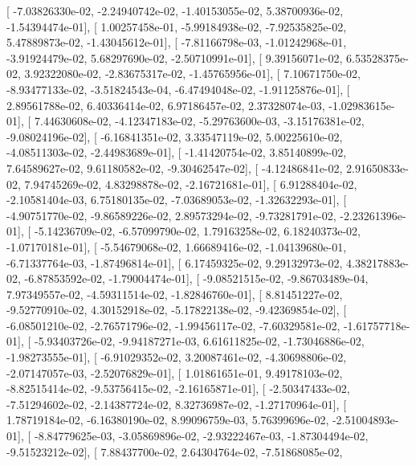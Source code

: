 \documentclass{article}
\begin{document}
       [ -7.03826330e-02,  -2.24940742e-02,  -1.40153055e-02,
          5.38700936e-02,  -1.54394474e-01],
       [  1.00257458e-01,  -5.99184938e-02,  -7.92535825e-02,
          5.47889873e-02,  -1.43045612e-01],
       [ -7.81166798e-03,  -1.01242968e-01,  -3.91924479e-02,
          5.68297690e-02,  -2.50710991e-01],
       [  9.39156071e-02,   6.53528375e-02,   3.92322080e-02,
         -2.83675317e-02,  -1.45765956e-01],
       [  7.10671750e-02,  -8.93477133e-02,  -3.51824543e-04,
         -6.47494048e-02,  -1.91125876e-01],
       [  2.89561788e-02,   6.40336414e-02,   6.97186457e-02,
          2.37328074e-03,  -1.02983615e-01],
       [  7.44630608e-02,  -4.12347183e-02,  -5.29763600e-03,
         -3.15176381e-02,  -9.08024196e-02],
       [ -6.16841351e-02,   3.33547119e-02,   5.00225610e-02,
         -4.08511303e-02,  -2.44983689e-01],
       [ -1.41420754e-02,   3.85140899e-02,   7.64589627e-02,
          9.61180582e-02,  -9.30462547e-02],
       [ -4.12486841e-02,   2.91650833e-02,   7.94745269e-02,
          4.83298878e-02,  -2.16721681e-01],
       [  6.91288404e-02,  -2.10581404e-03,   6.75180135e-02,
         -7.03689053e-02,  -1.32632293e-01],
       [ -4.90751770e-02,  -9.86589226e-02,   2.89573294e-02,
         -9.73281791e-02,  -2.23261396e-01],
       [ -5.14236709e-02,  -6.57099790e-02,   1.79163258e-02,
          6.18240373e-02,  -1.07170181e-01],
       [ -5.54679068e-02,   1.66689416e-02,  -1.04139680e-01,
         -6.71337764e-03,  -1.87496814e-01],
       [  6.17459325e-02,   9.29132973e-02,   4.38217883e-02,
         -6.87853592e-02,  -1.79004474e-01],
       [ -9.08521515e-02,  -9.86703489e-04,   7.97349557e-02,
         -4.59311514e-02,  -1.82846760e-01],
       [  8.81451227e-02,  -9.52770910e-02,   4.30152918e-02,
         -5.17822138e-02,  -9.42369854e-02],
       [ -6.08501210e-02,  -2.76571796e-02,  -1.99456117e-02,
         -7.60329581e-02,  -1.61757718e-01],
       [ -5.93403726e-02,  -9.94187271e-03,   6.61611825e-02,
         -1.73046886e-02,  -1.98273555e-01],
       [ -6.91029352e-02,   3.20087461e-02,  -4.30698806e-02,
         -2.07147057e-03,  -2.52076829e-01],
       [  1.01861651e-01,   9.49178103e-02,  -8.82515414e-02,
         -9.53756415e-02,  -2.16165871e-01],
       [ -2.50347433e-02,  -7.51294602e-02,  -2.14387724e-02,
          8.32736987e-02,  -1.27170964e-01],
       [  1.78719184e-02,  -6.16380190e-02,   8.99096759e-03,
          5.76399696e-02,  -2.51004893e-01],
       [ -8.84779625e-03,  -3.05869896e-02,  -2.93222467e-03,
         -1.87304494e-02,  -9.51523212e-02],
       [  7.88437700e-02,   2.64304764e-02,  -7.51868085e-02,
\end{document}
